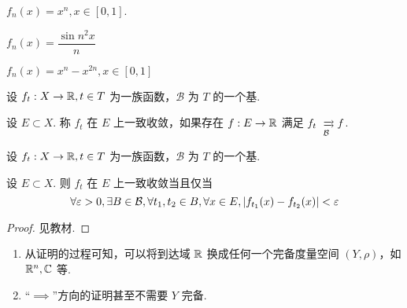 \begin{example}
    $f_n(x)=x^n,x\in[0,1]$.
\end{example}

\begin{example}
    $f_n(x)=\dfrac{\sin n^2x}{n}$
\end{example}

\begin{example}
    $f_n(x)=x^n-x^{2n},x\in[0,1]$
\end{example}


\begin{example}
    设 $f_t:X\to\mathbb{R},t\in T$ 为一族函数，$\mathcal{B}$ 为 $T$ 的一个基.

    设 $E\subset X$. 称 $f_t$ 在 $E$ 上一致收敛，如果存在 $f:E\to\mathbb{R}$ 满足 $f_t\xrightrightarrows[\mathcal{B}]{}f$.
\end{example}

\begin{theorem}[Cauchy]
    设 $f_t:X\to\mathbb{R},t\in T$ 为一族函数，$\mathcal{B}$ 为 $T$ 的一个基.

    设 $E\subset X$. 则 $f_t$ 在 $E$ 上一致收敛当且仅当
$$
\forall\varepsilon>0,\exists B\in\mathcal{B},\forall t_1,t_2\in B,\forall x\in E,\left\lvert{f_{t_1}(x)-f_{t_2}(x)}\right\rvert<\varepsilon
$$
\end{theorem}
\begin{proof}
    见教材.
\end{proof}

\begin{hint}
    \begin{enumerate}
        \item 从证明的过程可知，可以将到达域 $\mathbb{R}$ 换成任何一个完备度量空间 $(Y,\rho)$，如 $\mathbb{R}^n,\mathbb{C}$ 等.
        
        \item “$\implies$”方向的证明甚至不需要 $Y$ 完备.
    \end{enumerate}
\end{hint}
